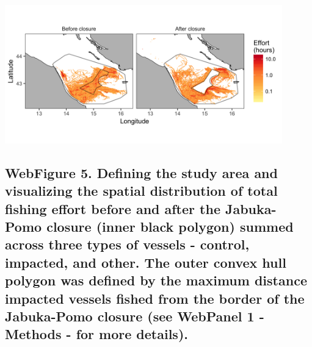 \documentclass[11pt,]{article}
\begin{document}
\includegraphics[width=0.90000\textwidth]{../workspace/process_effort_figs/map_impacted_aggregate.png}

\newpage

\subsection{WebFigure 5. Defining the study area and visualizing the
spatial distribution of total fishing effort before and after the
Jabuka-Pomo closure (inner black polygon) summed across three types of
vessels - control, impacted, and other. The outer convex hull polygon
was defined by the maximum distance impacted vessels fished from the
border of the Jabuka-Pomo closure (see WebPanel 1 - Methods - for more
details).}\label{webfigure-5.-defining-the-study-area-and-visualizing-the-spatial-distribution-of-total-fishing-effort-before-and-after-the-jabuka-pomo-closure-inner-black-polygon-summed-across-three-types-of-vessels---control-impacted-and-other.-the-outer-convex-hull-polygon-was-defined-by-the-maximum-distance-impacted-vessels-fished-from-the-border-of-the-jabuka-pomo-closure-see-webpanel-1---methods---for-more-details.}
\end{document}
